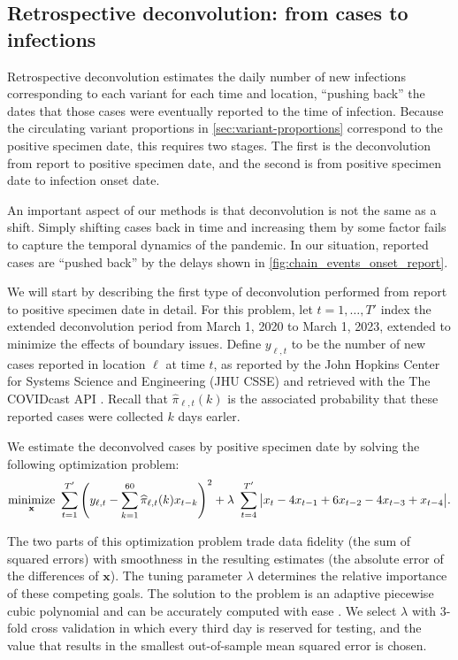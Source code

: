 \subsection{Retrospective deconvolution: from cases to infections}
\label{sec:deconvolution}

Retrospective deconvolution estimates the daily number of new infections
corresponding to each variant for each time and location, ``pushing back'' the
dates that those cases were eventually reported to the time of infection.
Because the circulating variant proportions in \autoref{sec:variant-proportions}
correspond to the positive specimen date, this requires two stages. The first is
the deconvolution from report to positive specimen date, and the second is from
positive specimen date to infection onset date.

An important aspect of our methods is that deconvolution is not the same as a
shift. Simply shifting cases back in time and increasing them by some
factor fails to capture the temporal dynamics of the pandemic. In our
situation, reported cases are ``pushed back'' by the delays shown in
\autoref{fig:chain_events_onset_report}. 

We will start by describing the first type of deconvolution performed from
report to positive specimen date in detail. For this problem, let $t=1,\ldots,T'$
index the extended deconvolution period from March 1, 2020 to March 1, 2023,
extended to minimize the effects of boundary issues.  Define $y_{\ell,t}$
to be the number of new cases reported in location $\ell$ at time $t$, as
reported by the John Hopkins Center for Systems Science and Engineering (JHU
CSSE)\citealp{dong2020interactive} and retrieved with the The COVIDcast API
\citep{reinhart2021open}. Recall that $\widehat{\pi}_{\ell,t}(k)$ is the
associated probability that these reported cases were collected $k$ days earler. 

We estimate the deconvolved cases by positive specimen date by solving the
following optimization problem:
\begin{align}
\operatorname*{minimize}_{\mathbf{x}}\ \sum_{t=1}^{T'} 
\left( y_{\ell,t} -  \sum_{k=1}^{60}\widehat{\pi}_{\ell,t}(k) x_{t-k} \right)^2 
+ \lambda\ \sum_{t=4}^{T'} \big|x_t - 4x_{t-1} + 6x_{t-2} -4x_{t-3}+ x_{t-4}\big|.
\end{align}

The two parts of this optimization problem trade data fidelity (the sum of
squared errors) with smoothness in the resulting estimates (the absolute error
of the differences of $\mathbf{x}$). The tuning parameter $\lambda$ determines
the relative importance of these competing goals. The solution to the problem is
an adaptive piecewise cubic polynomial \citep{tibshirani2014adaptive,
tibshirani2022divided} and can be accurately computed with ease
\citep{ramdas2016fast}. We select $\lambda$ with $3$-fold cross validation
\citep{jahja2022real} in which every third day is reserved for testing, and the
value that results in the smallest out-of-sample mean squared error is chosen.

